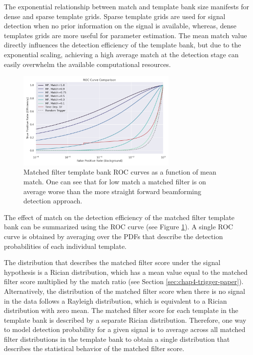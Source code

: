 The exponential relationship between match and template bank size manifests for dense and sparse template grids. Sparse template grids are used for signal detection when no prior information on the signal is available, whereas, dense templates grids are more useful for parameter estimation. The mean match value directly influences the detection efficiency of the template bank, but due to the exponential scaling, achieving a high average match at the detection stage can easily overwhelm the available computational resources.

\begin{figure}[htbp]
    \centering
    \includegraphics*[width=0.7\textwidth]{figs/Chapter-4/220223_mf_roc_curve_comparison_with_bf.png}
    \caption{\label{fig:chap4-mf-roc-curve-match-analysis} Matched filter template bank ROC curves as a function of mean match. One can see that for low match a matched filter is on average worse than the more straight forward beamforming detection approach. }
\end{figure}

The effect of match on the detection efficiency of the matched filter template bank can be summarized using the ROC curve (see Figure \ref{fig:chap4-mf-roc-curve-match-analysis}). A single ROC curve is obtained by averaging over the PDFs that describe the detection probabilities of each individual template. 

The distribution that describes the matched filter score under the signal hypothesis is a Rician distribution, which has a mean value equal to the matched filter score multiplied by the match ratio (see Section \ref{sec:chap4-trigger-paper}). Alternatively, the distribution of the matched filter score when there is no signal in the data follows a Rayleigh distribution, which is equivalent to a Rician distribution with zero mean. The matched filter score for each template in the template bank is described by a separate Rician distribution. Therefore, one way to model detection probability for a given signal is to average across all matched filter distributions in the template bank to obtain a single distribution that describes the statistical behavior of the matched filter score.

